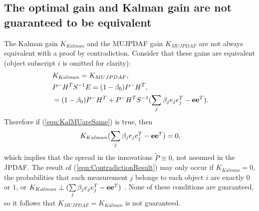 \documentclass[letterpaper, 10pt, conference]{ieeeconf}
\newcommand{\refeqn}[1]{(\ref{eqn:#1})}
\begin{document}
\begin{appendix}
\subsection{The optimal gain and Kalman gain are not guaranteed to be equivalent}
The Kalman gain $K_{Kalman}$ and the MUJPDAF gain $K_{MUJPDAF}$ are not always equivalent with a proof by contradiction. Consider that these gains are equivalent (object subscript $i$ is omitted for clarity):
\begin{align}
&K_{Kalman}=K_{MUJPDAF},\nonumber
\\
&P^-H^TS^{-1}E=(1-\beta_{0})P^-H^T,\nonumber
\\
&=(1-\beta_{0})P^-H^T+P^-H^TS^{-1}({\sum\limits_{j} \beta_{j}e_{j}e_{j}^T-{\bf{e}}}{\bf{e}}^T).\label{eqn:KalMUareSame}
\end{align}
Therefore if \refeqn{KalMUareSame} is true, then
\begin{align}
K_{Kalman}({\sum\limits_{j} \beta_{j}e_{j}e_{j}^T-{\bf{e}}}{\bf{e}}^T)=0,\label{eqn:ContradictionResult}
\end{align}
which implies that the spread in the innovations $\tilde P\equiv0$, not assumed in the JPDAF.
The result of \refeqn{ContradictionResult} may only occur if $K_{Kalman}=0$, the probabilities that each measurement $j$ belongs to each object $i$ are exactly $0$ or $1$, or $K_{Kalman}\perp({\sum\limits_{j} \beta_{j}e_{j}e_{j}^T-{\bf{e}}}{\bf{e}}^T)$ . None of these conditions are guaranteed, so it follows that $K_{MUJPDAF}=K_{Kalman}$ is not guaranteed.

\end{appendix}




\end{document}
